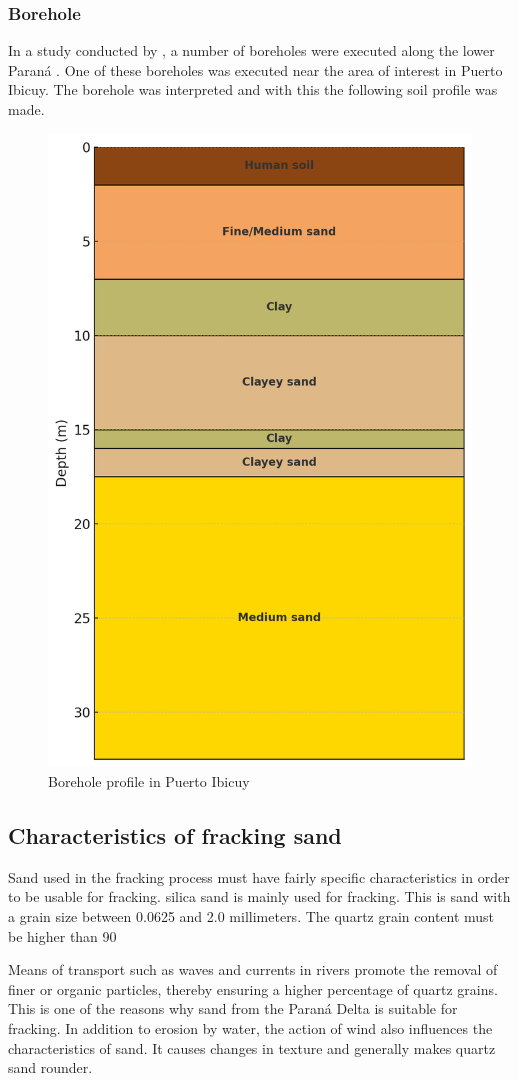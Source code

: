 \subsubsection{Borehole}
In a study conducted by \citeauthor{amatoEstratigrafiaCuaternariaSubsuelo2009}, a number of boreholes were executed along the lower Paraná \autocite{amatoEstratigrafiaCuaternariaSubsuelo2009}. One of these boreholes was executed near the area of interest in Puerto Ibicuy. The borehole was interpreted and with this the following soil profile was made.

\begin{figure}[H]
    \centering
    \includegraphics[width=0.45\linewidth]{figures//ch9/Bodemprofiel.png}
    \caption{Borehole profile in Puerto Ibicuy \autocite{amatoEstratigrafiaCuaternariaSubsuelo2009}}
    \label{fig:borehole}
\end{figure}

\subsection{Characteristics of fracking sand}
\label{sec:Charact. of fs}
Sand used in the fracking process must have fairly specific characteristics in order to be usable for fracking. silica sand is mainly used for fracking. This is sand with a grain size between 0.0625 and 2.0 millimeters. The quartz grain content must be higher than 90%

Means of transport such as waves and currents in rivers promote the removal of finer or organic particles, thereby ensuring a higher percentage of quartz grains. This is one of the reasons why sand from the Paraná Delta is suitable for fracking.
In addition to erosion by water, the action of wind also influences the characteristics of sand. It causes changes in texture and generally makes quartz sand rounder. 

